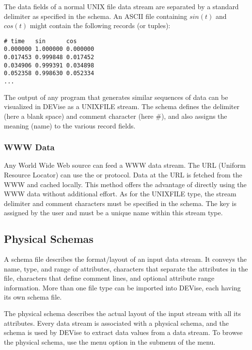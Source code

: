 The data fields of a normal UNIX file data stream are separated by a standard
delimiter as specified in the schema. An ASCII file containing $sin(t)$ and
$cos(t)$ might contain the following records (or tuples):

\begin{verbatim}
# time   sin      cos
0.000000 1.000000 0.000000
0.017453 0.999848 0.017452
0.034906 0.999391 0.034898
0.052358 0.998630 0.052334
... 
\end{verbatim}

The output of any program that generates similar sequences of data can be
visualized in DEVise as a UNIXFILE stream. The schema defines the delimiter
(here a blank space) and comment character (here \#), and also assigns the
meaning (name) to the various record fields.

\subsubsection{WWW Data}

Any World Wide Web source can feed a WWW data stream. The URL (Uniform Resource
Locator) can use the  or  protocol. Data at the URL is
fetched from the WWW and cached locally. This method offers the advantage of
directly using the WWW data without additional effort. As for the UNIXFILE type,
the stream delimiter and comment characters must be specified in the schema. The
key is assigned by the user and must be a unique name within this stream type.


\subsection{Physical Schemas}
\label{sect:phys_schema}

A schema file describes the format/layout of an input data stream. It conveys
the name, type, and range of attributes, characters that separate the attributes
in the file, characters that define comment lines, and
optional attribute range information. More than one file type can be imported
into DEVise, each having its own schema file.

The physical schema describes the actual layout of the input stream with all its
attributes. Every data stream is associated with a physical schema, and the
schema is used by DEVise to extract data values from a data stream. To browse
the physical schema, use the  menu option in the 
submenu of the  menu.


